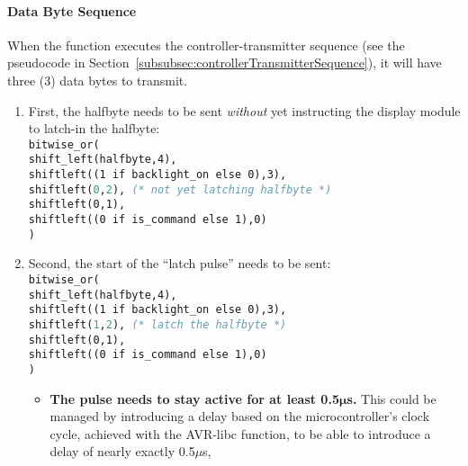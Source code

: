\paragraph{Data Byte Sequence}

When the  function executes the controller-transmitter sequence (see the pseudocode in Section~\ref{subsubsec:controllerTransmitterSequence}), it will have three (3) data bytes to transmit.

\begin{enumerate}
    \item First, the halfbyte needs to be sent \textit{without} yet instructing the display module to latch-in the halfbyte: \\
            \phantom{XX}\lstinline{bitwise_or(} \\
            \phantom{XXXX}\lstinline{shift_left(halfbyte,4),} \\
            \phantom{XXXX}\lstinline{shiftleft((1 if backlight_on else 0),3),} \\
            \phantom{XXXX}\lstinline[language=pascal]{shiftleft(0,2), (* not yet latching halfbyte *)} \\
            \phantom{XXXX}\lstinline{shiftleft(0,1),} \\
            \phantom{XXXX}\lstinline{shiftleft((0 if is_command else 1),0)} \\
            \phantom{XX}\lstinline{)}
    \item Second, the start of the ``latch pulse'' needs to be sent: \\
            \phantom{XX}\lstinline{bitwise_or(} \\
            \phantom{XXXX}\lstinline{shift_left(halfbyte,4),} \\
            \phantom{XXXX}\lstinline{shiftleft((1 if backlight_on else 0),3),} \\
            \phantom{XXXX}\lstinline[language=pascal]{shiftleft(1,2), (* latch the halfbyte *)} \\
            \phantom{XXXX}\lstinline{shiftleft(0,1),} \\
            \phantom{XXXX}\lstinline{shiftleft((0 if is_command else 1),0)} \\
            \phantom{XX}\lstinline{)}
    \begin{itemize}
        \item \textbf{The pulse needs to stay active for at least 0.5$\mathbf{\mu}$s.}
            This could be managed by introducing a delay based on the microcontroller's clock cycle, achieved with the AVR-libc  function,\cite{avrDelay} to be able to introduce a delay of nearly exactly 0.5$\mu$s,

\end{itemize}
\end{enumerate}
